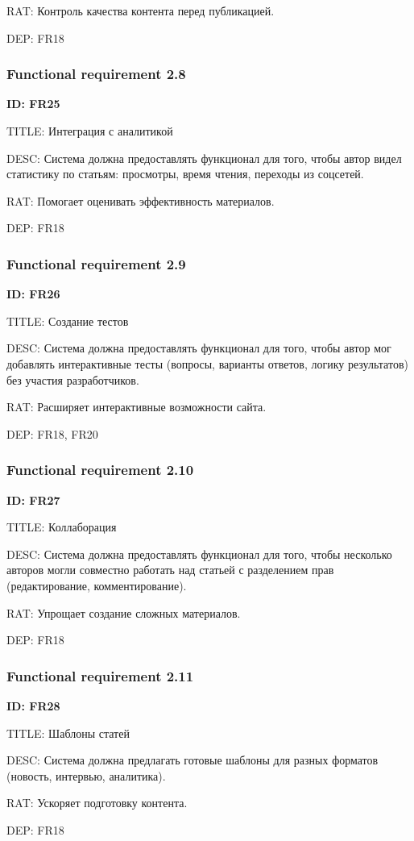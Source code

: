 \documentclass{scrreprt}
\begin{document}
RAT: Контроль качества контента перед публикацией.

DEP: FR18
\subsubsection{Functional requirement 2.8}
\textbf{ID: FR25}

TITLE: Интеграция с аналитикой

DESC: Система должна предоставлять функционал для того, чтобы автор видел статистику по статьям: просмотры, время чтения, переходы из соцсетей.

RAT: Помогает оценивать эффективность материалов.

DEP: FR18
\subsubsection{Functional requirement 2.9}
\textbf{ID: FR26}

TITLE: Создание тестов

DESC: Система должна предоставлять функционал для того, чтобы автор мог добавлять интерактивные тесты (вопросы, варианты ответов, логику результатов) без участия разработчиков.

RAT: Расширяет интерактивные возможности сайта.

DEP: FR18, FR20
\subsubsection{Functional requirement 2.10}
\textbf{ID: FR27}

TITLE: Коллаборация

DESC: Система должна предоставлять функционал для того, чтобы несколько авторов могли совместно работать над статьей с разделением прав (редактирование, комментирование).

RAT: Упрощает создание сложных материалов.

DEP: FR18
\subsubsection{Functional requirement 2.11}
\textbf{ID: FR28}

TITLE: Шаблоны статей

DESC: Система должна предлагать готовые шаблоны для разных форматов (новость, интервью, аналитика).

RAT: Ускоряет подготовку контента.

DEP: FR18
\end{document}
